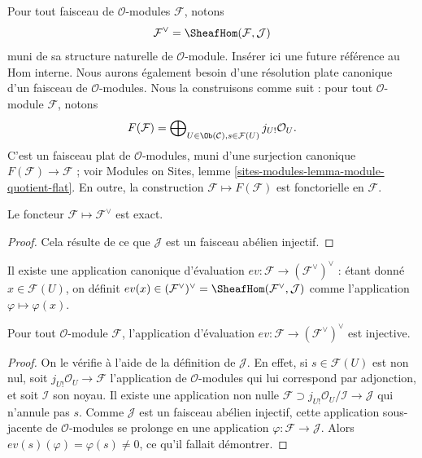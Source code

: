 \medskip\noindent
Pour tout faisceau de $\mathcal{O}$-modules $\mathcal{F}$, notons
$$
\mathcal{F}^\vee
=
\SheafHom(\mathcal{F}, \mathcal{J})
$$
muni de sa structure naturelle de $\mathcal{O}$-module.
Insérer ici une future référence au Hom interne.
Nous aurons également besoin d'une résolution plate canonique d'un faisceau de
$\mathcal{O}$-modules. Nous la construisons comme suit : pour tout
$\mathcal{O}$-module $\mathcal{F}$, notons
$$
F(\mathcal{F})
=
\bigoplus\nolimits_{U \in \Ob(\mathcal{C}), s \in \mathcal{F}(U)}
j_{U!}\mathcal{O}_U.
$$
C'est un faisceau plat de $\mathcal{O}$-modules, muni d'une surjection canonique
$F(\mathcal{F}) \to \mathcal{F}$ ; voir
Modules on Sites, lemme \ref{sites-modules-lemma-module-quotient-flat}.
En outre, la construction $\mathcal{F} \mapsto F(\mathcal{F})$ est
fonctorielle en $\mathcal{F}$.

\begin{lemma}
\label{lemma-vee-exact-sheaves}
Le foncteur $\mathcal{F} \mapsto \mathcal{F}^\vee$ est exact.
\end{lemma}

\begin{proof}
Cela résulte de ce que $\mathcal{J}$ est un faisceau abélien injectif.
\end{proof}

\noindent
Il existe une application canonique d'évaluation
$ev : \mathcal{F} \to (\mathcal{F}^\vee)^\vee$ : étant donné
$x \in \mathcal{F}(U)$, on définit
$ev(x) \in (\mathcal{F}^\vee)^\vee =
\SheafHom(\mathcal{F}^\vee, \mathcal{J})$ comme l'application
$\varphi \mapsto \varphi(x)$.

\begin{lemma}
\label{lemma-ev-injective-sheaves}
Pour tout $\mathcal{O}$-module $\mathcal{F}$, l'application d'évaluation
$ev : \mathcal{F} \to (\mathcal{F}^\vee)^\vee$ est injective.
\end{lemma}

\begin{proof}
On le vérifie à l'aide de la définition de $\mathcal{J}$. En effet, si
$s \in \mathcal{F}(U)$ est non nul, soit
$j_{U!}\mathcal{O}_U \to \mathcal{F}$ l'application de
$\mathcal{O}$-modules qui lui correspond par adjonction, et soit
$\mathcal{I}$ son noyau. Il existe une application non nulle
$\mathcal{F} \supset j_{U!}\mathcal{O}_U/\mathcal{I} \to \mathcal{J}$ qui
n'annule pas $s$. Comme $\mathcal{J}$ est un faisceau abélien injectif, cette
application sous-jacente de $\mathcal{O}$-modules se prolonge en une application
$\varphi : \mathcal{F} \to \mathcal{J}$.
Alors $ev(s)(\varphi) = \varphi(s) \not = 0$, ce qu'il fallait démontrer.
\end{proof}

